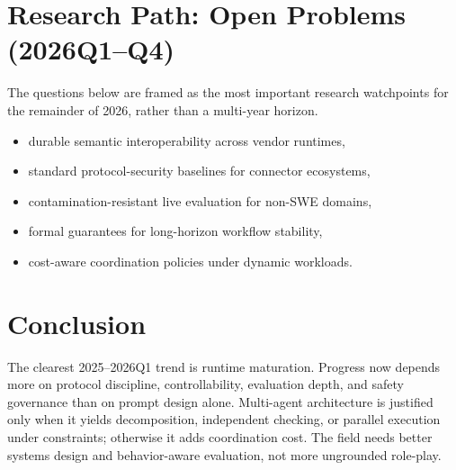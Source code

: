 \documentclass[11pt]{article}
\begin{document}
\section{Research Path: Open Problems (2026Q1--Q4)}
\noindent The questions below are framed as the most important research watchpoints for the remainder of 2026, rather than a multi-year horizon.
\begin{itemize}[leftmargin=1.2em]
  \item durable semantic interoperability across vendor runtimes,
  \item standard protocol-security baselines for connector ecosystems,
  \item contamination-resistant live evaluation for non-SWE domains,
  \item formal guarantees for long-horizon workflow stability,
  \item cost-aware coordination policies under dynamic workloads.
\end{itemize}

\section{Conclusion}
The clearest 2025--2026Q1 trend is runtime maturation. Progress now depends more on protocol discipline, controllability, evaluation depth, and safety governance than on prompt design alone. Multi-agent architecture is justified only when it yields decomposition, independent checking, or parallel execution under constraints; otherwise it adds coordination cost. The field needs better systems design and behavior-aware evaluation, not more ungrounded role-play.
\end{document}
